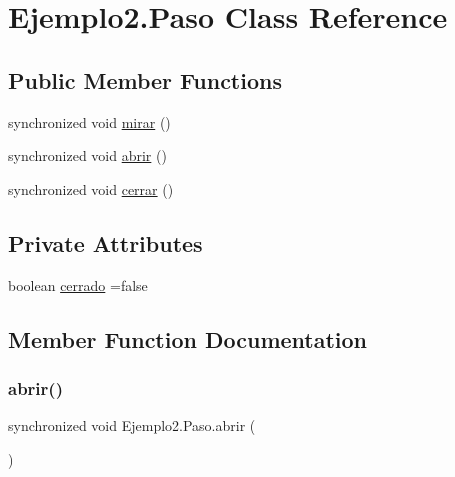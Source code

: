 \hypertarget{class_ejemplo2_1_1_paso}{}\section{Ejemplo2.\+Paso Class Reference}
\label{class_ejemplo2_1_1_paso}
\subsection*{Public Member Functions}
\begin{DoxyCompactItemize}
\item 
synchronized void \mbox{\hyperlink{class_ejemplo2_1_1_paso_a6d40a9340440e7b4fc7f19a35df68001}{mirar}} ()
\item 
synchronized void \mbox{\hyperlink{class_ejemplo2_1_1_paso_a257040915c16c05d7c914cecfc4b26fa}{abrir}} ()
\item 
synchronized void \mbox{\hyperlink{class_ejemplo2_1_1_paso_aef2fe3c01a50bc9b3b2351d3ce067d5b}{cerrar}} ()
\end{DoxyCompactItemize}
\subsection*{Private Attributes}
\begin{DoxyCompactItemize}
\item 
boolean \mbox{\hyperlink{class_ejemplo2_1_1_paso_a035610e8d1c26212866e1195440287ec}{cerrado}} =false
\end{DoxyCompactItemize}


\subsection{Member Function Documentation}
\mbox{\label{class_ejemplo2_1_1_paso_a257040915c16c05d7c914cecfc4b26fa}} 
\subsubsection{\texorpdfstring{abrir()}{abrir()}}
{\footnotesize\ttfamily synchronized void Ejemplo2.\+Paso.\+abrir (\begin{DoxyParamCaption}{ }\end{DoxyParamCaption})\hspace{0.3cm}{\ttfamily [inline]}}


